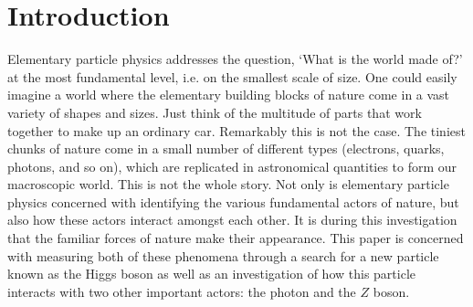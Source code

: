 
\section{Introduction} %





Elementary particle physics addresses the question, `What is the world made of?' 
at the most fundamental level, i.e. on the smallest scale of size. 
One could easily imagine a world where the elementary building blocks of 
nature come in a vast variety of shapes and sizes. Just think of the multitude of 
parts that work together to make up an ordinary car. Remarkably this is not
the case. The tiniest chunks of nature come in a small number of different types
(electrons, quarks, photons, and so on), which are replicated in astronomical
quantities to form our macroscopic world. This is not the whole story.
Not only is elementary particle physics concerned with identifying the various 
fundamental actors of nature, but also how these actors interact amongst each other.
It is during this investigation that the familiar forces of nature make their
appearance. This paper is concerned with measuring both of these phenomena through 
a search for a new particle known as the Higgs boson as well as an investigation of
how this particle interacts with two other important actors: the photon and the 
$Z$ boson.

